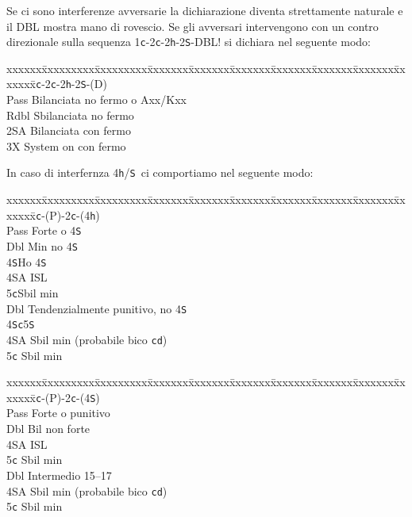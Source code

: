 \documentclass[a4paper,italian]{article}
\newcommand{\BS}{\small{\texttt{S}}}
\newcommand{\BC}{\small{\texttt{c}}}
\newcommand{\BD}{\small{\texttt{d}}}
\newcommand{\BH}{\small{\texttt{h}}}
\newenvironment{bidtable}
{\begin{tabbing}

    xxxxxx\=xxxxxxxxx\=xxxxxxxxx\=xxxxxxx\=xxxxxxx\=xxxxxxx\=xxxxxxx\=xxxxxxx\=xxxxxxx\=xxxxxxx\=\kill}
{\end{tabbing} }%
\newenvironment{attenzione}[1]
{\begin{tcolorbox}[colframe=red!80!white,title=#1]}
    {
\end{tcolorbox} }%
\begin{document}
\bigbreak
\begin{attenzione}{Interferenze}
    Se ci sono interferenze avversarie la dichiarazione diventa strettamente naturale e il DBL mostra mano di rovescio. Se gli avversari intervengono con un contro direzionale sulla sequenza 1\BC -2\BC -2\BH -2\BS -DBL! si dichiara nel seguente modo:
    \bigbreak
    \begin{bidtable}
        1\BC-2\BC-2\BH-2\BS-(D)\+\\
        Pass \> Bilanciata no fermo o Axx/Kxx\\
        Rdbl \> Sbilanciata no fermo\\
        2\small{SA} \> Bilanciata con fermo\\
        3X \> System on con fermo\-
    \end{bidtable}
    In caso di interfernza 4\BH /\BS\ ci comportiamo nel seguente modo:
    \bigbreak
    \begin{bidtable}
        1\BC-(P)-2\BC-(4\BH)\+\\
        Pass \> Forte o 4\BS\+\\
        Dbl \>Min no 4\BS\ \\
        4\BS \>Ho 4\BS\ \\
        4\small{SA} \> ISL\\
        5\BC \>Sbil min\-\\
        Dbl \> Tendenzialmente punitivo, no 4\BS \\
        4\BS {}\BC 5\BS \\
        4\small{SA} \> Sbil min (probabile bico \BC \BD )\\
        5\BC \> Sbil min\-
    \end{bidtable}
    \bigbreak
    \begin{bidtable}
        1\BC-(P)-2\BC-(4\BS)\+\\
        Pass \> Forte o punitivo\+\\
        Dbl\> Bil non forte\\
        4\small{SA}\> ISL\\
        5\BC\> Sbil min\-\\
        Dbl \> Intermedio 15--17\\
        4\small{SA} \> Sbil min (probabile bico \BC \BD )\\
        5\BC \> Sbil min\-
    \end{bidtable}
\end{attenzione}
\end{document}
